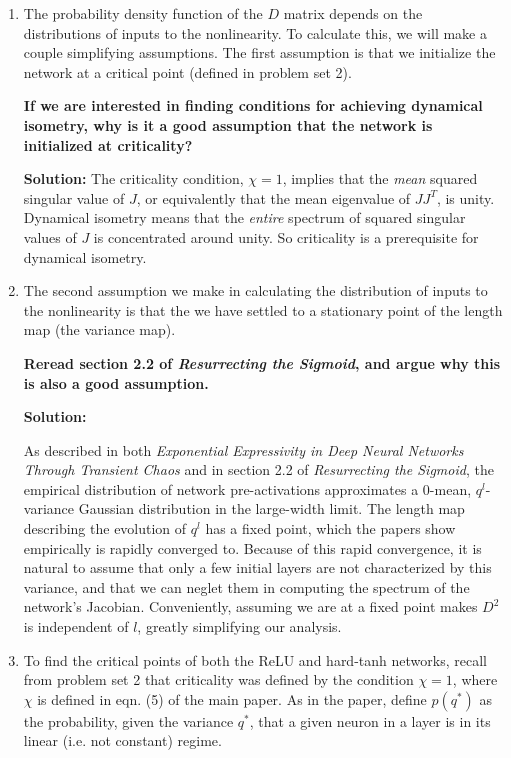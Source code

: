 \documentclass[a4paper]{article}
\begin{document}
\begin{enumerate}[label=(\alph*)]
\item The probability density function of the $D$ matrix depends on the distributions of inputs to the nonlinearity.  To calculate this, we will make a couple simplifying assumptions.  The first assumption is that we initialize the network at a critical point (defined in problem set 2).  

\textbf{If we are interested in finding conditions for achieving dynamical isometry, why is it a good assumption that the network is initialized at criticality?}

\begin{tcolorbox}
\textbf{Solution:}
The criticality condition, $\chi = 1$, implies that the \emph{mean} squared singular value of $J$, or equivalently that the mean eigenvalue of $JJ^T$, is unity.  Dynamical isometry means that the \emph{entire} spectrum of squared singular values of $J$ is concentrated around unity.  So criticality is a prerequisite for dynamical isometry. 
\end{tcolorbox}

\item The second assumption we make in calculating the distribution of inputs to the nonlinearity is that the we have settled to a stationary point of the length map (the variance map). 

\textbf{Reread section 2.2 of
\emph{Resurrecting the Sigmoid}, and argue why this is also a good assumption.}

\begin{tcolorbox}
\textbf{Solution:}

As described in both \emph{Exponential Expressivity in Deep Neural Networks Through Transient Chaos} and in section 2.2 of \emph{Resurrecting the Sigmoid}, the empirical distribution of network pre-activations approximates a $0$-mean, $q^l$-variance Gaussian distribution in the large-width limit.  The length map describing the evolution of $q^l$ has a fixed point, which the papers show empirically is rapidly converged to.  Because of this rapid convergence, it is natural to assume that only a few initial layers are not characterized by this variance, and that we can neglet them in computing the spectrum of the network's Jacobian.  Conveniently, assuming we are at a fixed point makes $D^2$ is independent of $l$, greatly simplifying our analysis. 
\end{tcolorbox}

\item To find the critical points of both the ReLU and hard-tanh networks, recall from problem set 2 that criticality was defined by the condition $\chi = 1$, where $\chi$ is defined in eqn. (5) of the main paper. 
As in the paper, define $p(q^*)$ as the probability, given the variance $q^*$, that a given neuron in a layer is in its linear (i.e. not constant) regime.  


\end{enumerate}
\end{document}
